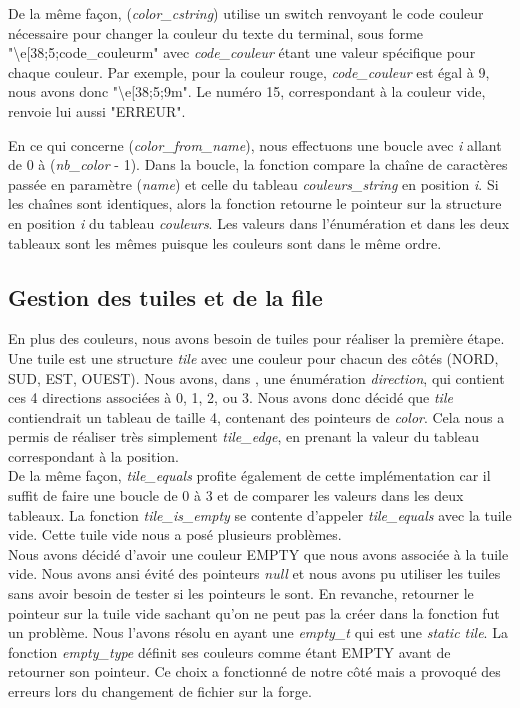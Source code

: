 \documentclass[a4paper]{article}
\begin{document}
De la même façon, (\emph{color\_cstring}) utilise un switch renvoyant le code couleur nécessaire pour changer la couleur du texte du terminal, sous forme "\textbackslash e[38;5;{code\_couleur}m" avec \emph{code\_couleur} étant une valeur spécifique pour chaque couleur. Par exemple, pour la couleur rouge, \emph{code\_couleur} est égal à 9, nous avons donc "\textbackslash e[38;5;9m". Le numéro 15, correspondant à la couleur vide, renvoie lui aussi "ERREUR".

En ce qui concerne (\emph{color\_from\_name}), nous effectuons une boucle avec \emph{i} allant de 0 à (\emph{nb\_color} - 1). Dans la boucle, la fonction compare la chaîne de caractères passée en paramètre (\emph{name}) et celle du tableau \emph{couleurs\_string} en position \emph{i}. Si les chaînes sont identiques, alors la fonction retourne le pointeur sur la structure en position \emph{i} du tableau \emph{couleurs}. Les valeurs dans l'énumération et dans les deux tableaux sont les mêmes puisque les couleurs sont dans le même ordre.

\subsection{Gestion des tuiles et de la file}
En plus des couleurs, nous avons besoin de tuiles pour réaliser la première étape. Une tuile est une structure \emph{tile} avec une couleur pour chacun des côtés (NORD, SUD, EST, OUEST). Nous avons, dans , une énumération \emph{direction}, qui contient ces 4 directions associées à 0, 1, 2, ou 3. Nous avons donc décidé que \emph{tile} contiendrait un tableau de taille 4, contenant des pointeurs de \emph{color}. Cela nous a permis de réaliser très simplement \emph{tile\_edge}, en prenant la valeur du tableau correspondant à la position. \\

De la même façon, \emph{tile\_equals} profite également de cette implémentation car il suffit de faire une boucle de 0 à 3 et de comparer les valeurs dans les deux tableaux. La fonction \emph{tile\_is\_empty} se contente d'appeler \emph{tile\_equals} avec la tuile vide.
Cette tuile vide nous a posé plusieurs problèmes. \\

Nous avons décidé d'avoir une couleur EMPTY que nous avons associée à la tuile vide. Nous avons ansi évité des pointeurs \emph{null} et nous avons pu utiliser les tuiles sans avoir besoin de tester si les pointeurs le sont. En revanche, retourner le pointeur sur la tuile vide sachant qu'on ne peut pas la créer dans la fonction fut un problème.
Nous l'avons résolu en ayant une \emph{empty\_t} qui est une \emph{static tile}. La fonction \emph{empty\_type} définit ses couleurs comme étant EMPTY avant de retourner son pointeur. Ce choix a fonctionné de notre côté mais a provoqué des erreurs lors du changement de fichier sur la forge. \\
\end{document}
